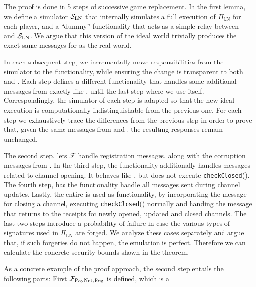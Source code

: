   \begin{proofsketch}
    The proof is done in 5 steps of successive game replacement. In the first
    lemma, we define a simulator $\mathcal{S}_{\mathrm{LN}}$ that internally
    simulates a full execution of $\Pi_{\mathrm{LN}}$ for each player, and a
    ``dummy'' functionality that acts as a simple relay between \environment{}
    and $\mathcal{S}_{\mathrm{LN}}$. We argue that this version of the ideal
    world trivially produces the exact same messages for \environment{} as the
    real world.

    In each subsequent step, we incrementally move responsibilities from the
    simulator to the functionality, while ensuring the change is transparent to
    both \environment{} and \adversary. Each step defines a different
    functionality that handles some additional messages from \environment{}
    exactly like \fpaynet, until the last step where we use \fpaynet{} itself.
    Correspondingly, the simulator of each step is adapted so that the new ideal
    execution is computationally indistinguishable from the previous one. For
    each step we exhaustively trace the differences from the previous step in
    order to prove that, given the same messages from \environment{} and
    \adversary{}, the resulting responses remain unchanged.

    The second step, lets $\mathcal{F}$ handle registration messages, along with
    the corruption messages from \simulator. In the third step, the
    functionality additionally handles messages related to channel opening. It
    behaves like \fpaynet, but does not execute \texttt{checkClosed}().  The
    fourth step, has the functionality handle all messages sent during channel
    updates. Lastly, the entire \fpaynet{} is used as functionality, by
    incorporating the message for closing a channel, executing
    \texttt{checkClosed}() normally and handing the message that returns to
    \environment{} the receipts for newly opened, updated and closed channels.
    The last two steps introduce a probability of failure in case the various
    types of signatures used in $\Pi_{\mathrm{LN}}$ are forged. We analyze these
    cases separately and argue that, if such forgeries do not happen, the
    emulation is perfect. Therefore we can calculate the concrete security
    bounds shown in the theorem.
  \end{proofsketch}
  As a concrete example of the proof approach, the second step entails the
  following parts: First $\mathcal{F}_{\mathrm{PayNet}}{}_{\mathrm{, Reg}}$ is defined, which is a
